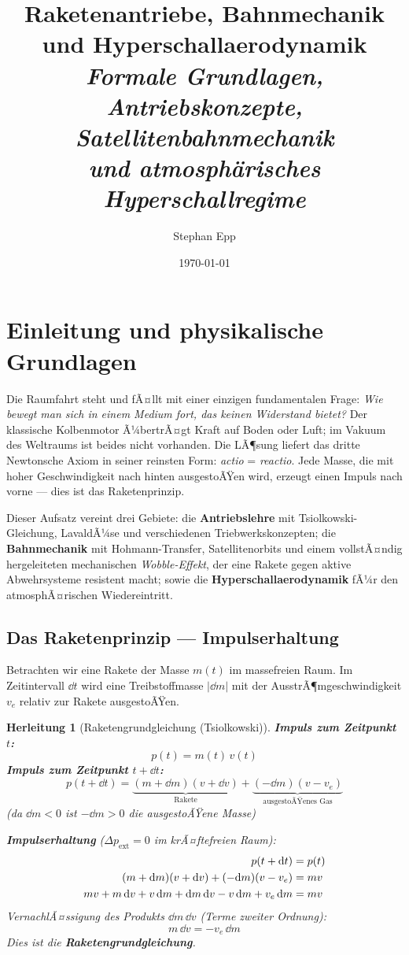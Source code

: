﻿\documentclass[12pt,a4paper]{article}
\title{Raketenantriebe, Bahnmechanik und Hyperschallaerodynamik\\[0.4em]
  \large\textit{Formale Grundlagen, Antriebskonzepte, Satellitenbahnmechanik\\
und atmosph\"{a}risches Hyperschallregime}}
\author{Stephan Epp}
\date{\today}
\newtheorem{herleitung}{Herleitung}[section]
\newcommand{\ve}{v_e}
\begin{document}
\maketitle

\tableofcontents
\newpage

\section{Einleitung und physikalische Grundlagen}

Die Raumfahrt steht und fÃ¤llt mit einer einzigen fundamentalen Frage: \emph{Wie bewegt
man sich in einem Medium fort, das keinen Widerstand bietet?} Der klassische
Kolbenmotor Ã¼bertrÃ¤gt Kraft auf Boden oder Luft; im Vakuum des Weltraums ist beides
nicht vorhanden. Die LÃ¶sung liefert das dritte Newtonsche Axiom in seiner reinsten
Form: \textit{actio} = \textit{reactio}. Jede Masse, die mit hoher Geschwindigkeit
nach hinten ausgestoÃŸen wird, erzeugt einen Impuls nach vorne --- dies ist das
Raketenprinzip.

Dieser Aufsatz vereint drei Gebiete: die \textbf{Antriebslehre} mit Tsiolkowski-Gleichung,
LavaldÃ¼se und verschiedenen Triebwerkskonzepten; die \textbf{Bahnmechanik} mit Hohmann-Transfer,
Satellitenorbits und einem vollstÃ¤ndig hergeleiteten mechanischen \emph{Wobble-Effekt},
der eine Rakete gegen aktive Abwehrsysteme resistent macht; sowie die
\textbf{Hyperschallaerodynamik} fÃ¼r den atmosphÃ¤rischen Wiedereintritt.

\subsection{Das Raketenprinzip --- Impulserhaltung}

Betrachten wir eine Rakete der Masse $m(t)$ im massefreien Raum. Im Zeitintervall
$\dd t$ wird eine Treibstoffmasse $|\dd m|$ mit der AusstrÃ¶mgeschwindigkeit $\ve$
relativ zur Rakete ausgestoÃŸen.

\begin{herleitung}[Raketengrundgleichung (Tsiolkowski)]
\textbf{Impuls zum Zeitpunkt $t$:}
\[
  p(t) = m(t)\,v(t)
\]
\textbf{Impuls zum Zeitpunkt $t + \dd t$:}
\[
  p(t+\dd t) = \underbrace{(m+\dd m)(v+\dd v)}_{\text{Rakete}} +
               \underbrace{(-\dd m)(v - \ve)}_{\text{ausgestoÃŸenes Gas}}
\]
(da $\dd m < 0$ ist $-\dd m > 0$ die ausgestoÃŸene Masse)

\textbf{Impulserhaltung} ($\Delta p_{\text{ext}} = 0$ im krÃ¤ftefreien Raum):
\begin{align}
  p(t+\dd t) &= p(t) \notag\\
  (m+\dd m)(v+\dd v) + (-\dd m)(v-\ve) &= mv \notag\\
  mv + m\,\dd v + v\,\dd m + \dd m\,\dd v - v\,\dd m + \ve\,\dd m &= mv \notag
\end{align}
VernachlÃ¤ssigung des Produkts $\dd m\,\dd v$ (Terme zweiter Ordnung):
\[
  \boxed{m\,\dd v = -\ve\,\dd m}
\]
Dies ist die \textbf{Raketengrundgleichung}.
\end{herleitung}
\end{document}
